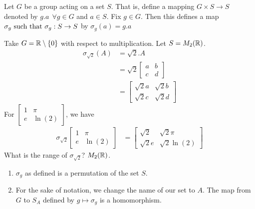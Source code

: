 Let $G$ be a group acting on a set $S$. That is, define a mapping $G \times S \to S$ denoted by $g.a ~~\forall g \in G$ and $a \in S$. Fix $g \in G.$ Then this defines a map $\sigma_g \text{ such that } \sigma_g : S \to S$ by $\sigma_g (a) = g.a$

\begin{example}
    Take $G = \mathbb{R} \setminus \left\{0\right\}$ with respect to multiplication. Let $S = M_2(\mathbb{R})$.
    \begin{align*}
        \sigma_{\sqrt{2}}(A) &= \sqrt{2}.A \\
        &= \sqrt{2} \begin{bmatrix}
            a & b \\
            c & d
        \end{bmatrix} \\
        &= \begin{bmatrix}
            \sqrt{2}a & \sqrt{2}b \\
            \sqrt{2}c & \sqrt{2}d
        \end{bmatrix}
    \end{align*}
    For $\begin{bmatrix}
        1 & \pi \\
        e & \ln(2)
    \end{bmatrix}$, we have
    \begin{align*}
        \sigma_{\sqrt{2}} \begin{bmatrix}
            1 & \pi \\
            e & \ln(2)
        \end{bmatrix} &= \begin{bmatrix}
            \sqrt{2} & \sqrt{2}\pi \\
            \sqrt{2}e & \sqrt{2}\ln(2)
        \end{bmatrix}
    \end{align*}
    What is the range of $\sigma_{\sqrt{2}}$? $M_2(\mathbb{R})$.
\end{example}

\begin{assertion}
    \begin{enumerate}
        \item $\sigma_g$ as defined is a permutation of the set $S$.
        \item For the sake of notation, we change the name of our set to $A$. The map from $G$ to $S_A$ defined by $g \mapsto \sigma_g$ is a homomorphism.
    \end{enumerate}
\end{assertion}

